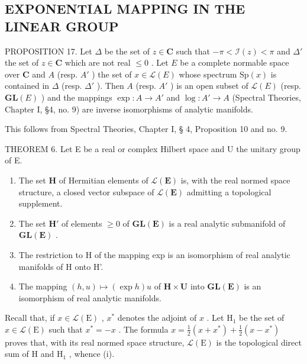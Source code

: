 \subsection{EXPONENTIAL MAPPING IN THE LINEAR GROUP}

PROPOSITION 17. Let \(\Delta\) be the set of \(z\in \mathbf{C}\) such that \(-\pi < \mathcal{I}(z) < \pi\) and \(\Delta'\) the set of \(z\in \mathbf{C}\) which are not real \(\leqslant 0\) . Let \(E\) be a complete normable space over \(\mathbf{C}\) and \(A\) (resp. \(A'\) ) the set of \(x\in \mathcal{L}(E)\) whose spectrum \(\mathrm{Sp}(x)\) is contained in \(\Delta\) (resp. \(\Delta'\) ). Then \(A\) (resp. \(A'\) ) is an open subset of \(\mathcal{L}(E)\) (resp. \(\mathbf{GL}(E)\) ) and the mappings \(\exp: A\to A'\) and \(\log: A'\to A\) (Spectral Theories, Chapter I, §4, no. 9) are inverse isomorphisms of analytic manifolds.

This follows from Spectral Theories, Chapter I, § 4, Proposition 10 and no. 9.

THEOREM 6. Let E be a real or complex Hilbert space and U the unitary group of E.

\begin{enumerate}
\def\labelenumi{(\roman{enumi})}
\item
  The set \(\mathbf{H}\) of Hermitian elements of \(\mathcal{L}(\mathbf{E})\) is, with the real normed space structure, a closed vector subspace of \(\mathcal{L}(\mathbf{E})\) admitting a topological supplement.
\item
  The set \(\mathbf{H}'\) of elements \(\geqslant 0\) of \(\mathbf{GL}(\mathbf{E})\) is a real analytic submanifold of \(\mathbf{GL}(\mathbf{E})\) .
\item
  The restriction to H of the mapping exp is an isomorphism of real analytic manifolds of H onto H'.
\item
  The mapping \((h,u)\mapsto (\exp h)u\) of \(\mathbf{H}\times \mathbf{U}\) into \(\mathbf{GL}(\mathbf{E})\) is an isomorphism of real analytic manifolds.
\end{enumerate}

Recall that, if \(x \in \mathcal{L}(\mathrm{E})\) , \(x^*\) denotes the adjoint of \(x\) . Let \(\mathrm{H}_1\) be the set of \(x \in \mathcal{L}(\mathrm{E})\) such that \(x^* = -x\) . The formula \(x = \frac{1}{2}(x + x^*) + \frac{1}{2}(x - x^*)\) proves that, with its real normed space structure, \(\mathcal{L}(\mathrm{E})\) is the topological direct sum of \(\mathrm{H}\) and \(\mathrm{H}_1\) , whence (i).

